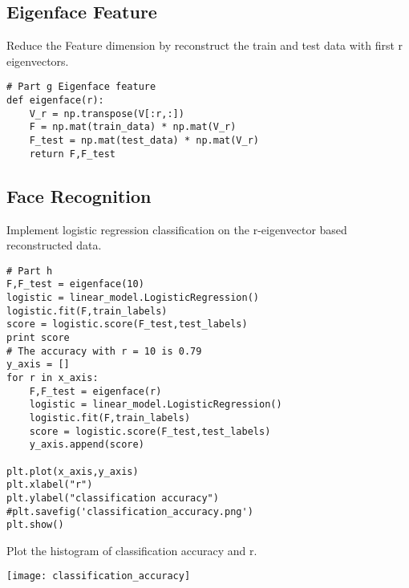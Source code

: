 \documentclass[a4paper]{article}
\begin{document}
\subsection*{Eigenface Feature}
Reduce the Feature dimension by reconstruct the train and test data with first r eigenvectors. 
\begin{lstlisting}
# Part g Eigenface feature
def eigenface(r):
    V_r = np.transpose(V[:r,:])
    F = np.mat(train_data) * np.mat(V_r)
    F_test = np.mat(test_data) * np.mat(V_r)
    return F,F_test
\end{lstlisting}
\subsection*{Face Recognition}
Implement logistic regression classification on the r-eigenvector based reconstructed data. 
\begin{lstlisting}
# Part h
F,F_test = eigenface(10)
logistic = linear_model.LogisticRegression()
logistic.fit(F,train_labels)
score = logistic.score(F_test,test_labels)
print score
# The accuracy with r = 10 is 0.79
y_axis = []
for r in x_axis:
    F,F_test = eigenface(r)
    logistic = linear_model.LogisticRegression()
    logistic.fit(F,train_labels)
    score = logistic.score(F_test,test_labels)
    y_axis.append(score)

plt.plot(x_axis,y_axis)
plt.xlabel("r")
plt.ylabel("classification accuracy")
#plt.savefig('classification_accuracy.png')
plt.show()
\end{lstlisting}
Plot the histogram of classification accuracy and r.
\begin{center}
\texttt{[image: classification\_accuracy]}
\end{center}
\end{document}
